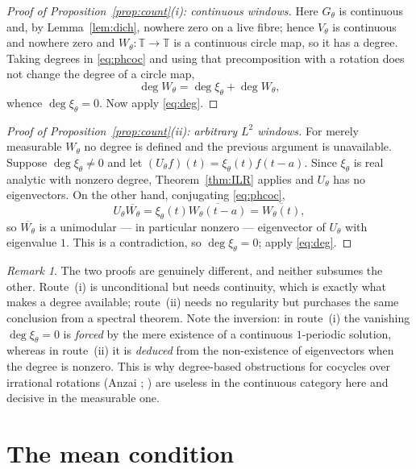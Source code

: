\documentclass[11pt]{amsart}
\theoremstyle{remark}
\newtheorem{remark}[theorem]{Remark}
\newcommand{\T}{\mathbb T}
\DeclareMathOperator{\dg}{deg}
\begin{document}
\begin{proof}[Proof of Proposition~\ref{prop:count}(i): continuous windows]
Here $G_\theta$ is continuous and, by Lemma~\ref{lem:dich}, nowhere zero on a live fibre; hence
$V_\theta$ is continuous and nowhere zero and $W_\theta:\T\to\T$ is a continuous circle map,
so it has a degree. Taking degrees in \eqref{eq:phcoc} and using that precomposition with a
rotation does not change the degree of a circle map,
\[
\dg W_\theta=\dg\xi_\theta+\dg W_\theta ,
\]
whence $\dg\xi_\theta=0$. Now apply \eqref{eq:deg}.
\end{proof}

\begin{proof}[Proof of Proposition~\ref{prop:count}(ii): arbitrary $L^2$ windows]
For merely measurable $W_\theta$ no degree is defined and the previous argument is
unavailable. Suppose $\dg\xi_\theta\neq0$ and let $(U_\theta f)(t)=\xi_\theta(t)f(t-a)$. Since
$\xi_\theta$ is real analytic with nonzero degree, Theorem~\ref{thm:ILR} applies and
$U_\theta$ has no eigenvectors. On the other hand, conjugating \eqref{eq:phcoc},
\[
U_\theta\overline{W_\theta}
=\xi_\theta(t)\overline{W_\theta(t-a)}
=\overline{W_\theta(t)} ,
\]
so $\overline{W_\theta}$ is a unimodular --- in particular nonzero --- eigenvector of
$U_\theta$ with eigenvalue $1$. This is a contradiction, so $\dg\xi_\theta=0$; apply
\eqref{eq:deg}.
\end{proof}

\begin{remark}\label{rem:routes}
The two proofs are genuinely different, and neither subsumes the other. Route~(i) is
unconditional but needs continuity, which is exactly what makes a degree available; route~(ii)
needs no regularity but purchases the same conclusion from a spectral theorem. Note the
inversion: in route~(i) the vanishing $\dg\xi_\theta=0$ is \emph{forced} by the mere existence
of a continuous $1$-periodic solution, whereas in route~(ii) it is \emph{deduced} from the
non-existence of eigenvectors when the degree is nonzero. This is why degree-based
obstructions for cocycles over irrational rotations (Anzai \cite{Anz}; \cite{ILR}) are useless
in the continuous category here and decisive in the measurable one.
\end{remark}

\section{The mean condition}\label{sec:jensen}
\end{document}
